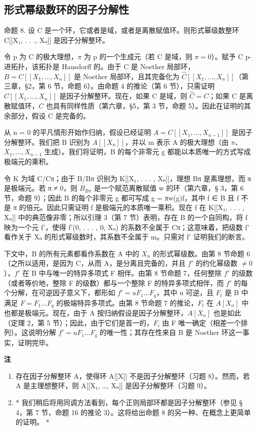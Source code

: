 \subsection{形式幂级数环的因子分解性}

命题 8. 设 C 是一个环，它或者是域，或者是离散赋值环。则形式幂级数整环 C{[}{[}X₁, . . ., Xₙ{]}{]} 是因子分解整环。

令 p 为 C 的极大理想，\(\pi\) 为 p 的一个生成元（若 C 是域，则 \(\pi = 0\)）。赋予 C p-进拓扑，该拓扑是 Hausdorff 的。由于 C 是 Noether 局部环，\(B = C[[X_{1}, \ldots, X_{n}]]\) 是 Noether 局部环，且其完备化为 \(\hat{C}[[X_{1}, \ldots, X_{n}]]\)（第三章，§2，第 6 节，命题 6）。由命题 4 的推论（第 6 节），只需证明 \(\hat{C}[[X_{1}, \ldots, X_{n}]]\) 是因子分解整环。现在，如果 C 是域，则 \(\hat{C} = C\)；如果 C 是离散赋值环，\(\hat{C}\) 也具有同样性质（第六章，§5，第 3 节，命题 5）。因此在证明的其余部分，假设 C 是完备的。

从 n = 0 的平凡情形开始作归纳，假设已经证明 \(A = C[[X_{1}, \ldots, X_{n-1}]]\) 是因子分解整环。我们把 B 识别为 \(A[[X_{n}]]\)，并以 m 表示 A 的极大理想（由 \(\pi\)、\(X_{1}, \ldots, X_{n-1}\) 生成）。我们将证明，B 的每个非零元 g 都能以本质唯一的方式写成极端元的乘积。

令 K 为域 C/Cπ；由于 B/Bπ 识别为 K{[}{[}X₁, . . . , Xₙ{]}{]}，理想 Bπ 是素理想，而 π 是极端元。若 π ≠ 0，则 \(B_{B\pi}\) 是一个赋范离散赋值 w 的环（第六章，§ 3，第 6 节，命题 9）；因此 B 的每个非零元 g 都可写成 g = πw(g)f，其中 f ∈ B 且 f 不是 π 的倍元。因此只需证明 f 是极端元的本质唯一乘积。现在 f 在 K{[}{[}X₁, . . . , Xₙ{]}{]} 中的典范像非零；所以引理 3（第 7 节）表明，存在 B 的一个自同构，将 f 映为一个元 f'，使得 f'(0, . . . , 0, Xₙ) 的系数不全属于 Cπ；这意味着，把级数 f' 看作关于 Xₙ 的形式幂级数时，其系数不全属于 m。只需对 f' 证明我们的断言。

下文中，B 的所有元素都看作系数在 A 中的 \(X_{n}\) 的形式幂级数。由第 8 节命题 6（之所以适用，是因为 C，从而 A，是分离且完备的，并且 \(f'\) 的约化幂级数 \(\neq0\)），\(f'\) 在 B 中与唯一的特异多项式 F 相伴。由第 8 节命题 7，任何整除 \(f'\) 的级数（或者等价地，整除 F 的级数）都与一个整除 F 的特异多项式相伴，而 \(f'\) 的每个分解，在可逆因子意义下，都形如 \(f' = uF_{1}\ldots F_{q}\)，其中 u 可逆，且 \(F_{t}\) 是 B 中满足 \(F = F_{1}\ldots F_{q}\) 的极端特异多项式。由第 8 节命题 7 的推论，\(F_{t}\) 在 \(A[X_{n}]\) 中也都是极端元。现在，由于 A 按归纳假设是因子分解整环，\(A[X_{n}]\) 也是如此（定理 2，第 5 节）；因此，由于它们是首一的，\(F_{i}\) 由 F 唯一确定（相差一个排列）。这说明分解 \(f' = uF_{1} \ldots F_{q}\) 的唯一性；其存在性来自 B 是 Noether 环这一事实，证明完毕。

\textbf{注}\par

\begin{enumerate}
\def\labelenumi{(\arabic{enumi})}
\item
  存在因子分解整环 A，使得环 A{[}{[}X{]}{]} 不是因子分解整环（习题 8）。然而，若 A 是主理想整环，则 A{[}{[}X₁, \ldots, Xₙ{]}{]} 是因子分解整环（习题 9）。
\item
  * 我们稍后将用同调方法看到，每个正则局部环都是因子分解整环（参见 § 4，第 7 节，命题 16 的推论 3）。这将给出命题 8 的另一种、在概念上更简单的证明。 *
\end{enumerate}

